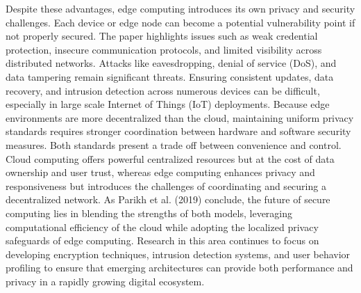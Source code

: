 \documentclass[conference]{IEEEtran}
\begin{document}
{Despite these advantages, edge computing introduces its own privacy and security challenges. Each device or edge node can become a potential vulnerability point if not properly secured. The paper highlights issues such as weak credential protection, insecure communication protocols, and limited visibility across distributed networks. Attacks like eavesdropping, denial of service (DoS), and data tampering remain significant threats. Ensuring consistent updates, data recovery, and intrusion detection across numerous devices can be difficult, especially in large scale Internet of Things (IoT) deployments. Because edge environments are more decentralized than the cloud, maintaining uniform privacy standards requires stronger coordination between hardware and software security measures. 
Both standards present a trade off between convenience and control. Cloud computing offers powerful centralized resources but at the cost of data ownership and user trust, whereas edge computing enhances privacy and responsiveness but introduces the challenges of coordinating and securing a decentralized network. As Parikh et al. (2019) conclude, the future of secure computing lies in blending the strengths of both models, leveraging computational efficiency of the cloud while adopting the localized privacy safeguards of edge computing. Research in this area continues to focus on developing encryption techniques, intrusion detection systems, and user behavior profiling to ensure that emerging architectures can provide both performance and privacy in a rapidly growing digital ecosystem.


}
\end{document}
